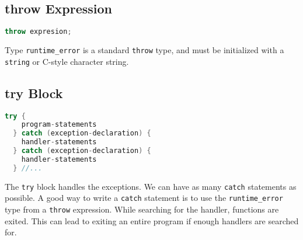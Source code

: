 \documentclass[12pt, a4paper]{report}
\begin{document}
\subsection{throw Expression}
\begin{lstlisting}[language=C++]
  throw expresion;
\end{lstlisting}
Type \verb|runtime_error| is a standard \verb|throw| type, and must be initialized with a \verb|string| or C-style character string.
\subsection{try Block}
\begin{lstlisting}[language=C++]
  try {
    program-statements
  } catch (exception-declaration) {
    handler-statements
  } catch (exception-declaration) {
    handler-statements
  } //...
\end{lstlisting}
The \verb|try| block handles the exceptions.
We can have as many \verb|catch| statements as possible.
A good way to write a \verb|catch| statement is to use the \verb|runtime_error| type from a \verb|throw| expression.
While searching for the handler, functions are exited.
This can lead to exiting an entire program if enough handlers are searched for.
\end{document}
